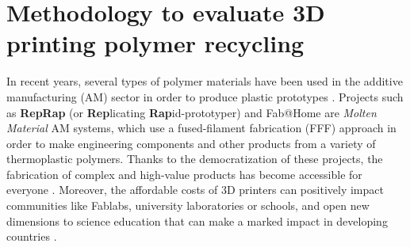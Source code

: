 












\section{Methodology to evaluate 3D printing polymer recycling}
\label{Section:General.methodology}


In recent years, several types of polymer materials have been used in the additive manufacturing (AM) sector in order to produce plastic prototypes \parencite{Guo2013}.
Projects such as \textbf{RepRap} (or \textbf{Rep}licating \textbf{Rap}id-prototyper) and Fab@Home are \textit{Molten Material} AM systems, which use a fused-filament fabrication (FFF) approach in order to make engineering components and other products from a variety of thermoplastic polymers.
Thanks to the democratization of these projects, the fabrication of complex and high-value products has become accessible for everyone \parencite{Kostakis2013,Pearce2014k}.  
Moreover, the affordable costs of 3D printers can positively impact communities like Fablabs, university laboratories or schools, and open new dimensions to science education that can make a marked impact in developing countries \parencite{Irwin2014}.


